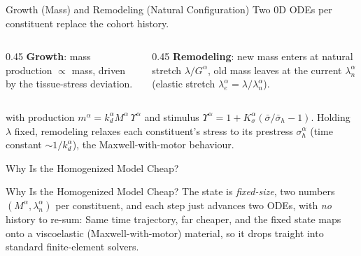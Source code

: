 \begin{frame}[t]{Growth (Mass) and Remodeling (Natural Configuration)}
  Two 0D ODEs per constituent replace the cohort history.\\[1em]
  \begin{columns}[c]
    \begin{column}{0.45\textwidth}
    \textbf{Growth}: mass production $\propto$ mass, driven by the tissue-stress deviation.\\
    \end{column}
    \begin{column}{0.45\textwidth}
      \textbf{Remodeling}: new mass enters at natural stretch $\lambda/G^{\alpha}$, old mass leaves at the
      current $\lambda_n^{\alpha}$ (elastic stretch $\lambda_e^{\alpha}=\lambda/\lambda_n^{\alpha}$).
    \end{column}
  \end{columns}
  \vspace{0.3em}
  with production $m^{\alpha}=k_d^{\alpha}M^{\alpha}\,\Upsilon^{\alpha}$ and stimulus
  $\Upsilon^{\alpha}=1+K_\sigma^{\alpha}(\bar\sigma/\bar\sigma_h-1)$. Holding
  $\lambda$ fixed, remodeling relaxes each constituent's stress to its prestress
  $\sigma_h^{\alpha}$ (time constant $\sim\!1/k_d^{\alpha}$), the Maxwell-with-motor
  behaviour.
\end{frame}

\begin{frame}[t]{}
  \begin{yourturnbox}{Why Is the Homogenized Model Cheap?}
  \end{yourturnbox}
  \vspace{0.6em}
  \srev
  \begin{answerbox}{Why Is the Homogenized Model Cheap?}
    The state is \emph{fixed-size}, two numbers $(M^{\alpha},\lambda_n^{\alpha})$ per constituent, and each step just advances two ODEs, with \emph{no} history to re-sum:
    Same time trajectory, far cheaper, and the fixed state maps onto a viscoelastic (Maxwell-with-motor) material, so it drops traight into standard finite-element solvers.
  \end{answerbox}
\end{frame}

